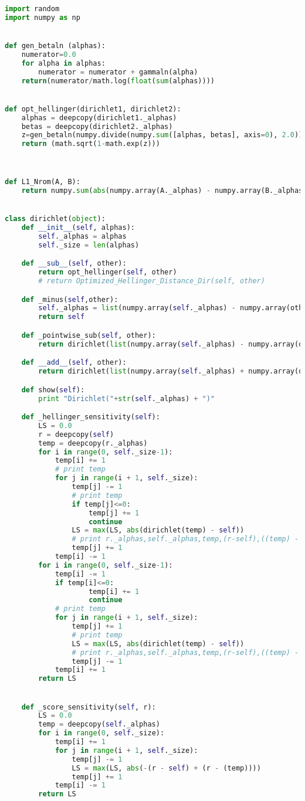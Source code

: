 
\begin{lstlisting}[label=code-p1-1, language=Python, caption=Python Code For Beta Distribution Object]
import random
import numpy as np


def gen_betaln (alphas):
	numerator=0.0
	for alpha in alphas:
		numerator = numerator + gammaln(alpha)
	return(numerator/math.log(float(sum(alphas))))


def opt_hellinger(dirichlet1, dirichlet2):
	alphas = deepcopy(dirichlet1._alphas)
	betas = deepcopy(dirichlet2._alphas)
	z=gen_betaln(numpy.divide(numpy.sum([alphas, betas], axis=0), 2.0))-0.5*(gen_betaln(alphas) + gen_betaln(betas))
	return (math.sqrt(1-math.exp(z)))



def L1_Nrom(A, B):
	return numpy.sum(abs(numpy.array(A._alphas) - numpy.array(B._alphas)))


class dirichlet(object):
	def __init__(self, alphas):
		self._alphas = alphas
		self._size = len(alphas)

	def __sub__(self, other):
		return opt_hellinger(self, other)
		# return Optimized_Hellinger_Distance_Dir(self, other)

	def _minus(self,other):
		self._alphas = list(numpy.array(self._alphas) - numpy.array(other._alphas))
		return self

	def _pointwise_sub(self, other):
		return dirichlet(list(numpy.array(self._alphas) - numpy.array(other._alphas)))

	def __add__(self, other):
		return dirichlet(list(numpy.array(self._alphas) + numpy.array(other._alphas)))

	def show(self):
		print "Dirichlet("+str(self._alphas) + ")"

	def _hellinger_sensitivity(self):
		LS = 0.0
		r = deepcopy(self)
		temp = deepcopy(r._alphas)
		for i in range(0, self._size-1):
			temp[i] += 1
			# print temp
			for j in range(i + 1, self._size):
				temp[j] -= 1
				# print temp
				if temp[j]<=0:
					temp[j] += 1
					continue
				LS = max(LS, abs(dirichlet(temp) - self))
				# print r._alphas,self._alphas,temp,(r-self),((temp) - self)
				temp[j] += 1
			temp[i] -= 1
		for i in range(0, self._size-1):
			temp[i] -= 1
			if temp[i]<=0:
					temp[i] += 1
					continue
			# print temp
			for j in range(i + 1, self._size):
				temp[j] += 1
				# print temp
				LS = max(LS, abs(dirichlet(temp) - self))
				# print r._alphas,self._alphas,temp,(r-self),((temp) - self)
				temp[j] -= 1
			temp[i] += 1		
		return LS


	def _score_sensitivity(self, r):
		LS = 0.0
		temp = deepcopy(self._alphas)
		for i in range(0, self._size):
			temp[i] += 1
			for j in range(i + 1, self._size):
				temp[j] -= 1
				LS = max(LS, abs(-(r - self) + (r - (temp))))
				temp[j] += 1
			temp[i] -= 1
		return LS
\end{lstlisting}


